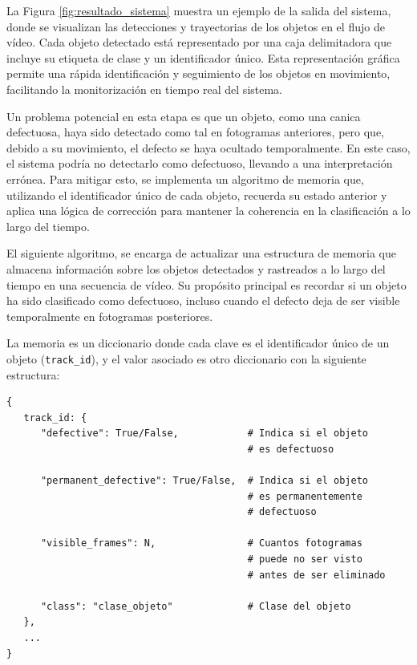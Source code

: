 \documentclass[11pt,spanish,listoffigures,listoftables]{tfgetsinf}
\begin{document}
La Figura \ref{fig:resultado_sistema} muestra un ejemplo de la salida del sistema, donde se visualizan las detecciones y trayectorias de los objetos en el flujo de vídeo. Cada objeto detectado está representado por una caja delimitadora que incluye su etiqueta de clase y un identificador único. Esta representación gráfica permite una rápida identificación y seguimiento de los objetos en movimiento, facilitando la monitorización en tiempo real del sistema.

Un problema potencial en esta etapa es que un objeto, como una canica defectuosa, haya sido detectado como tal en fotogramas anteriores, pero que, debido a su movimiento, el defecto se haya ocultado temporalmente. En este caso, el sistema podría no detectarlo como defectuoso, llevando a una interpretación errónea. Para mitigar esto, se implementa un algoritmo de memoria que, utilizando el identificador único de cada objeto, recuerda su estado anterior y aplica una lógica de corrección para mantener la coherencia en la clasificación a lo largo del tiempo.

El siguiente algoritmo, se encarga de actualizar una estructura de memoria que almacena información sobre los objetos detectados y rastreados a lo largo del tiempo en una secuencia de vídeo. Su propósito principal es recordar si un objeto ha sido clasificado como defectuoso, incluso cuando el defecto deja de ser visible temporalmente en fotogramas posteriores.


La memoria es un diccionario donde cada clave es el identificador único de un objeto (\texttt{track\_id}), y el valor asociado es otro diccionario con la siguiente estructura:

\begin{lstlisting}[style=seguimiento, caption={Estructura de la memoria de seguimiento}]
{
   track_id: {
      "defective": True/False,            # Indica si el objeto
                                          # es defectuoso

      "permanent_defective": True/False,  # Indica si el objeto 
                                          # es permanentemente 
                                          # defectuoso

      "visible_frames": N,                # Cuantos fotogramas 
                                          # puede no ser visto 
                                          # antes de ser eliminado

      "class": "clase_objeto"             # Clase del objeto
   },
   ...
}
\end{lstlisting}
\end{document}
